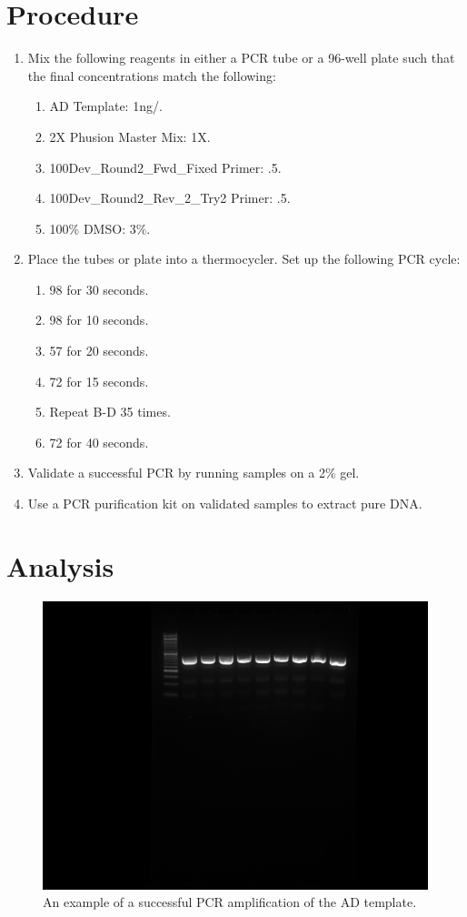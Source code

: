 \documentclass{ssiBio}
\begin{document}
\section{Procedure}
\begin{enumerate}
  \item{Mix the following reagents in either a PCR tube or a 96-well plate such that the final concentrations match the following:}
  \begin{enumerate}
    \item{AD Template: 1ng/\uL{}.}
    \item{2X Phusion Master Mix: 1X.}
    \item{100\uM \space Dev\_Round2\_Fwd\_Fixed Primer: .5\uM.}
    \item{100\uM \space Dev\_Round2\_Rev\_2\_Try2 Primer: .5\uM.}
    \item{100\% DMSO: 3\%.}
  \end{enumerate}
  \item{Place the tubes or plate into a thermocycler. Set up the following PCR cycle:}
  \begin{enumerate}
    \item{98\C{} for 30 seconds.}
    \item{98\C{} for 10 seconds.}
    \item{57\C{} for 20 seconds.}
    \item{72\C{} for 15 seconds.}
    \item{Repeat B-D 35 times.}
    \item{72\C{} for 40 seconds.}
  \end{enumerate}
  \stopPoint{}
  \item{Validate a successful PCR by running samples on a 2\% gel.}
  \item{Use a PCR purification kit on validated samples to extract pure DNA.}
\end{enumerate}

\section{Analysis}
\begin{figure}[ht]
  \centering
  \includegraphics[width=.5\linewidth]{images/gel.png}
  \caption{An example of a successful PCR amplification of the AD template.}
  \label{fig:gel1}
\end{figure}



\end{document}
